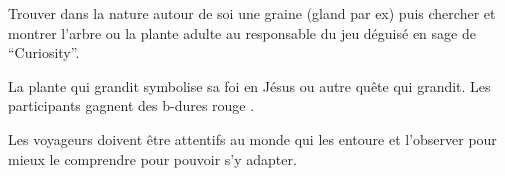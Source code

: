 \documentclass{grand-jeu}
\begin{document}
\begin{regles}
Trouver dans la nature autour de soi une graine (gland par ex) puis chercher et montrer l’arbre ou la plante adulte au responsable du jeu déguisé en sage de “Curiosity”.

La plante qui grandit symbolise sa foi en Jésus ou autre quête qui grandit. Les participants gagnent des b-dures rouge . 

\end{regles}

\begin{imaginaire}
Les voyageurs doivent être attentifs au monde qui les entoure et l'observer pour mieux le comprendre pour pouvoir s'y adapter. 
\end{imaginaire}

\begin{moments-stop}
\end{moments-stop}
\end{document}

